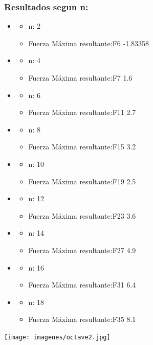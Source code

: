 \subsubsection{Resultados segun n:}
  \begin{itemize}
   \item 
      \begin{itemize}
	\item n: 2
	\item Fuerza M\'axima resultante:F6 -1.83358
      \end{itemize}
   \item 
      \begin{itemize}
	\item n: 4
	\item Fuerza M\'axima resultante:F7 1.6
      \end{itemize}
   \item 
      \begin{itemize}
	\item n: 6
	\item Fuerza M\'axima resultante:F11 2.7
      \end{itemize}
   \item 
      \begin{itemize}
	\item n: 8
	\item Fuerza M\'axima resultante:F15 3.2
      \end{itemize}
   \item 
      \begin{itemize}
	\item n: 10
	\item Fuerza M\'axima resultante:F19 2.5
      \end{itemize}
   \item 
      \begin{itemize}
	\item n: 12
	\item Fuerza M\'axima resultante:F23 3.6
      \end{itemize}
   \item 
      \begin{itemize}
	\item n: 14
	\item Fuerza M\'axima resultante:F27 4.9
      \end{itemize}
   \item 
      \begin{itemize}
	\item n: 16
	\item Fuerza M\'axima resultante:F31 6.4
      \end{itemize}
   \item 
      \begin{itemize}
	\item n: 18
	\item Fuerza M\'axima resultante:F35 8.1
      \end{itemize}
  \end{itemize}
  \begin{center}
 \texttt{[image: imagenes/octave2.jpg]}
\end{center}
